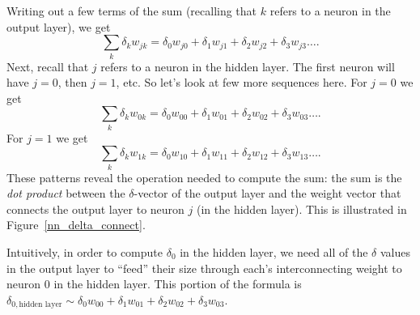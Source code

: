 \documentclass[12pt]{article}
\begin{document}
Writing out a few terms of the sum (recalling that $k$ refers to a neuron in the output layer), we get
\begin{equation}
\sum_k\delta_k w_{jk}=\delta_0 w_{j0} + \delta_1 w_{j1} + \delta_2 w_{j2}+ \delta_3 w_{j3}\dots.
\end{equation}
Next, recall that $j$ refers to a neuron in the hidden layer. The first neuron will have $j=0$, then $j=1$, etc. So let's look at few more sequences here. For $j=0$ we get
\begin{equation}
\sum_k\delta_k w_{0k}=\delta_0 w_{00} + \delta_1 w_{01} + \delta_2 w_{02}+ \delta_3 w_{03}\dots.
\end{equation}
For $j=1$ we get
\begin{equation}
\sum_k\delta_k w_{1k}=\delta_0 w_{10} + \delta_1 w_{11} + \delta_2 w_{12}+ \delta_3 w_{13}\dots.
\end{equation}
These patterns reveal the operation needed to compute the sum: the sum is the {\sl dot product} between the $\delta$-vector of the output layer and the weight vector that connects the output layer to neuron $j$ (in the hidden layer). This is illustrated in Figure~\ref{nn_delta_connect}.

Intuitively, in order to compute $\delta_0$ in the hidden layer, we need all of the $\delta$ values in the output layer to ``feed'' their size through each's interconnecting weight to neuron $0$ in the hidden layer. This portion of the formula is $\delta_{0,\textrm{hidden layer}}\sim \delta_0 w_{00} + \delta_1 w_{01} + \delta_2 w_{02}+ \delta_3 w_{03}$.
\end{document}
